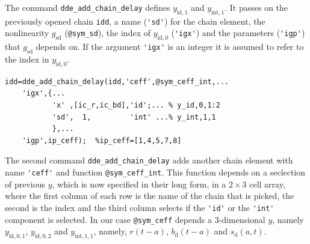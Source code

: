 \documentclass[10pt]{scrartcl}
\newcommand{\blist}[1]{\mbox{\lstinline!#1!}}
\begin{document}
The command \blist{dde_add_chain_delay} defines $y_{\mathrm{id},1}$
and $y_{\mathrm{int},1}$. It passes on the previously opened chain
\blist{idd}, a name (\blist{'sd'}) for the chain element, the
nonlinearity $g_\mathrm{sd}$ (\blist{@sym_sd}), the index of
$y_{\mathrm{id},0}$ (\blist{'igx'}) and the parameters (\blist{'igp'})
that $g_\mathrm{sd}$ depends on. If the argument \blist{'igx'} is an
integer it is assumed to refer to the index in
$y_{\mathrm{id},0}$.
\begin{lstlisting}
idd=dde_add_chain_delay(idd,'ceff',@sym_ceff_int,...
    'igx',{...
           'x' ,[ic_r,ic_bd],'id';... % y_id,0,1:2
           'sd',  1,         'int' ...% y_int,1,1
           },...
    'igp',ip_ceff);  %ip_ceff=[1,4,5,7,8]  
\end{lstlisting}
The second command \blist{dde_add_chain_delay} adds another chain
element with name \blist{'ceff'} and function
\blist{@sym_ceff_int}. This function depends on a seclection of
previous $y$, which is now specified in their long form, in a
$2\times3$ cell array, where the first column of each row is the name
of the chain that is picked, the second is the index and the third
column selects if the \blist{'id'} or the \blist{'int'} component is
selected. In our case \blist{@sym_ceff} depends a $3$-dimensional
$y$, namely $y_{\mathrm{id},0,1}$, $y_{\mathrm{id},0,2}$ and $y_{\mathrm{int},1,1}$, namely, $r(t-a)$, $b_\mathrm{d}(t-a)$ and $s_\mathrm{d}(a,t)$.
\end{document}
